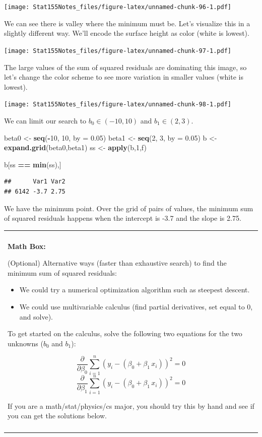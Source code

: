 \documentclass[]{book}
\newenvironment{Shaded}{\begin{snugshade}}{\end{snugshade}}
\newcommand{\DataTypeTok}[1]{\textcolor[rgb]{0.13,0.29,0.53}{#1}}
\newcommand{\DecValTok}[1]{\textcolor[rgb]{0.00,0.00,0.81}{#1}}
\newcommand{\FloatTok}[1]{\textcolor[rgb]{0.00,0.00,0.81}{#1}}
\newcommand{\KeywordTok}[1]{\textcolor[rgb]{0.13,0.29,0.53}{\textbf{#1}}}
\newcommand{\NormalTok}[1]{#1}
\newcommand{\OperatorTok}[1]{\textcolor[rgb]{0.81,0.36,0.00}{\textbf{#1}}}
\newcommand{\StringTok}[1]{\textcolor[rgb]{0.31,0.60,0.02}{#1}}
\providecommand{\tightlist}{%
  \setlength{\itemsep}{0pt}\setlength{\parskip}{0pt}}
\newenvironment{mathbox}
{
    \begin{center}
    
    \begin{tabular}{|p{0.8\textwidth}|}
    \rowcolor{LightYellow}
    \hline\\
    \rowcolor{LightYellow}
    \textbf{Math Box:}
}
{
    \\\rowcolor{LightYellow}
    \\\hline
    \end{tabular} 
    \end{center}
}
\begin{document}
\texttt{[image: Stat155Notes\_files/figure-latex/unnamed-chunk-96-1.pdf]}

We can see there is valley where the minimum must be. Let's visualize this in a slightly different way. We'll encode the surface height as color (white is lowest).

\texttt{[image: Stat155Notes\_files/figure-latex/unnamed-chunk-97-1.pdf]}

The large values of the sum of squared residuals are dominating this image, so let's change the color scheme to see more variation in smaller values (white is lowest).

\texttt{[image: Stat155Notes\_files/figure-latex/unnamed-chunk-98-1.pdf]}

We can limit our search to \(b_0 \in (-10,10)\) and \(b_1 \in (2,3)\).

\begin{Shaded}
\begin{Highlighting}[]
\NormalTok{beta0 <-}\StringTok{ }\KeywordTok{seq}\NormalTok{(}\OperatorTok{-}\DecValTok{10}\NormalTok{, }\DecValTok{10}\NormalTok{, }\DataTypeTok{by =} \FloatTok{0.05}\NormalTok{)}
\NormalTok{beta1 <-}\StringTok{ }\KeywordTok{seq}\NormalTok{(}\DecValTok{2}\NormalTok{, }\DecValTok{3}\NormalTok{, }\DataTypeTok{by =} \FloatTok{0.05}\NormalTok{)}
\NormalTok{b <-}\StringTok{ }\KeywordTok{expand.grid}\NormalTok{(beta0,beta1)}
\NormalTok{ss <-}\StringTok{ }\KeywordTok{apply}\NormalTok{(b,}\DecValTok{1}\NormalTok{,f)}

\NormalTok{b[ss }\OperatorTok{==}\StringTok{ }\KeywordTok{min}\NormalTok{(ss),]}
\end{Highlighting}
\end{Shaded}

\begin{verbatim}
##      Var1 Var2
## 6142 -3.7 2.75
\end{verbatim}

We have the minimum point. Over the grid of pairs of values, the minimum sum of squared residuals happens when the intercept is -3.7 and the slope is 2.75.

\begin{mathbox}
(Optional) Alternative ways (faster than exhaustive search) to find the
minimum sum of squared residuals:

\begin{itemize}
\tightlist
\item
  We could try a numerical optimization algorithm such as steepest
  descent.
\item
  We could use multivariable calculus (find partial derivatives, set
  equal to 0, and solve).
\end{itemize}

To get started on the calculus, solve the following two equations for
the two unknowns (\(b_0\) and \(b_1\)):

\[\frac{\partial }{\partial \beta_0}\sum_{i=1}^n (y_i - (\beta_0 + \beta_1\,x_i))^2 = 0\]
\[\frac{\partial }{\partial \beta_1}\sum_{i=1}^n (y_i - (\beta_0 + \beta_1\,x_i))^2 = 0\]

If you are a math/stat/physics/cs major, you should try this by hand and
see if you can get the solutions below.
\end{mathbox}
\end{document}
